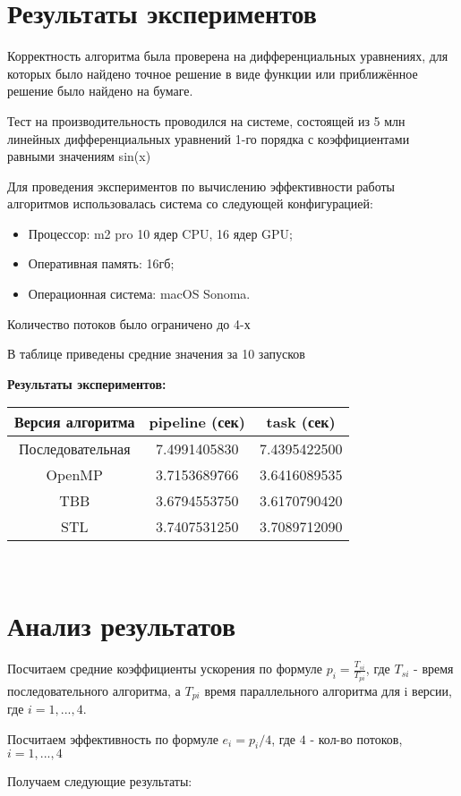\documentclass{report}
\begin{document}
\newpage

\section*{Результаты экспериментов}
\par Корректность алгоритма была проверена на дифференциальных уравнениях, для которых было найдено точное решение в виде функции или приближённое решение было найдено на бумаге.
\par Тест на производительность проводился на системе, состоящей из 5 млн линейных дифференциальных уравнений 1-го порядка с коэффициентами равными значениям sin(x)
\par Для проведения экспериментов по вычислению эффективности работы алгоритмов использовалась система со следующей конфигурацией:
\begin{itemize}
\item Процессор: m2 pro 10 ядер CPU, 16 ядер GPU;
\item Оперативная память: 16гб;
\item Операционная система: macOS Sonoma.
\end{itemize}
\par Количество потоков было ограничено до 4-х
\par В таблице приведены средние значения за 10 запусков
\par \textbf{Результаты экспериментов:}
\begin{center}
\begin{tabular}{ ||c | c | c ||  }
    \hline Версия алгоритма & pipeline (сек) & task (сек)\\ 
    \hline Последовательная & 7.4991405830 & 7.4395422500 \\
    \hline OpenMP & 3.7153689766 & 3.6416089535 \\
    \hline TBB & 3.6794553750 & 3.6170790420 \\ 
    \hline STL & 3.7407531250 & 3.7089712090 \\ 
    \hline
\end{tabular}\\[5mm]
\end{center}

\newpage

\section*{Анализ результатов}
\par Посчитаем средние коэффициенты ускорения по формуле $ p_i = \frac{T_{si}}{T_{pi}} $, где $T_{si}$ - время последовательного алгоритма, а $T_{pi}$ время параллельного алгоритма для {i} версии, где $i = {1, ..., 4}$.
\par Посчитаем эффективность по формуле $e_i = p_i / 4$, где $4$ - кол-во потоков, $i = {1, ..., 4}$ 
\par Получаем следующие результаты:
\end{document}
